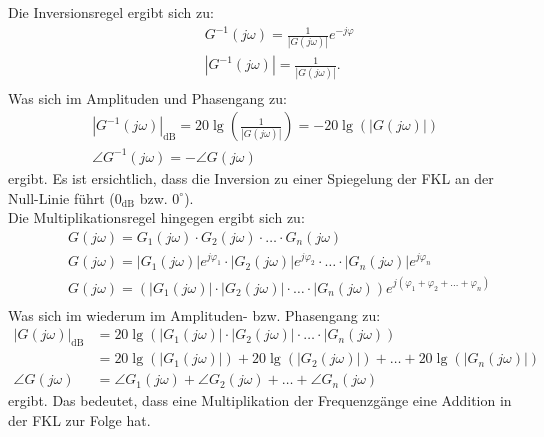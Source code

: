 %
Die Inversionsregel ergibt sich zu:
%
\begin{equation*}
\begin{aligned}
%
\quad\quad  &G^{-1}(j\omega)=\frac{1}{|G(j\omega)|}e^{-j\varphi}\\
%
&|G^{-1}(j\omega)|=\frac{1}{|G(j\omega)|}.\\
%
\end{aligned}
\end{equation*}
%
Was sich im Amplituden und Phasengang zu:
%
\begin{equation*}
\begin{aligned}
%
&|G^{-1}(j\omega)|_{\text{dB}}=20\lg\left(\frac{1}{|G(j\omega)|}\right)=-20\lg\left(|G(j\omega)|\right)\\
%
&\angle G^{-1}(j\omega) = - \angle G(j\omega)
%
\end{aligned}
\end{equation*}
%
ergibt. Es ist ersichtlich, dass die Inversion zu einer Spiegelung der FKL an der Null-Linie führt ($0_{\text{dB}}$ bzw. $0^{\circ}$).\\ Die Multiplikationsregel hingegen ergibt sich zu:
%
\begin{equation*}
\begin{aligned}
%
\quad\quad &G(j\omega)=G_{1}(j\omega)\cdot G_{2}(j\omega) \cdot\ldots\cdot G_{n}(j\omega)\\
%
&G(j\omega)=|G_{1}(j\omega)|e^{j\varphi_{1}}\cdot|G_{2}(j\omega)|e^{j\varphi_{2}}\cdot \ldots \cdot |G_{n}(j\omega)|e^{j\varphi_{n}}\\
%
&G(j\omega)=\left(|G_{1}(j\omega)|\cdot|G_{2}(j\omega)|\cdot\ldots\cdot|G_{n}(j\omega)\right)e^{j\left(\varphi_{1}+\varphi_{2}+\ldots+\varphi_{n}\right)}\\
%
\end{aligned}
\end{equation*}
%
Was sich im wiederum im Amplituden- bzw. Phasengang zu:
%
\begin{equation*}
\begin{aligned}
%
|G(j\omega)|_{\text{dB}}&=20\lg\left(|G_{1}(j\omega)|\cdot|G_{2}(j\omega)|\cdot\ldots\cdot|G_{n}(j\omega)\right)\\
%
&=20\lg\left(|G_{1}(j\omega)|\right)+20\lg\left(|G_{2}(j\omega)|\right)+\ldots+20\lg\left(|G_{n}(j\omega)|\right)\\
%
\angle G(j\omega) &=\angle G_{1}(j\omega)+\angle G_{2}(j\omega)+\ldots+\angle G_{n}(j\omega)
%
\end{aligned}
\end{equation*}
%
ergibt. Das bedeutet, dass eine Multiplikation der Frequenzgänge eine Addition in der FKL zur Folge hat.\\
